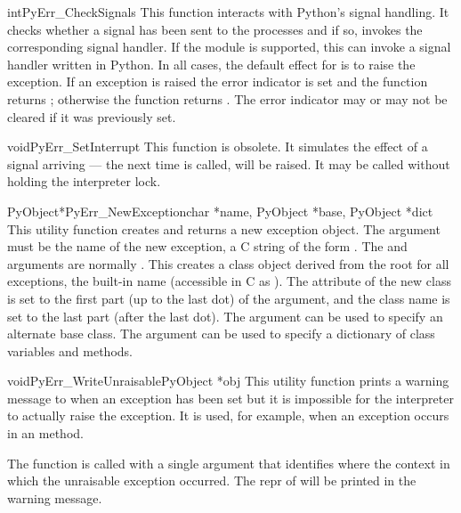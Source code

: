 \begin{cfuncdesc}{int}{PyErr_CheckSignals}{}
  This function interacts with Python's signal handling.  It checks
  whether a signal has been sent to the processes and if so, invokes
  the corresponding signal handler.  If the
   module is supported, this can
  invoke a signal handler written in Python.  In all cases, the
  default effect for  is to raise the
   exception.  If an exception is raised
  the error indicator is set and the function returns ;
  otherwise the function returns .  The error indicator may or
  may not be cleared if it was previously set.
\end{cfuncdesc}

\begin{cfuncdesc}{void}{PyErr_SetInterrupt}{}
  This function is obsolete.  It simulates the effect of a
   signal arriving --- the next time
   is called,
   will be raised.  It may be called
  without holding the interpreter lock.
\end{cfuncdesc}

\begin{cfuncdesc}{PyObject*}{PyErr_NewException}{char *name,
                                                 PyObject *base,
                                                 PyObject *dict}
  This utility function creates and returns a new exception object.
  The  argument must be the name of the new exception, a C
  string of the form .  The  and
   arguments are normally \NULL.  This creates a class
  object derived from the root for all exceptions, the built-in name
   (accessible in C as ).
  The  attribute of the new class is set to the
  first part (up to the last dot) of the  argument, and the
  class name is set to the last part (after the last dot).  The
   argument can be used to specify an alternate base class.
  The  argument can be used to specify a dictionary of class
  variables and methods.
\end{cfuncdesc}

\begin{cfuncdesc}{void}{PyErr_WriteUnraisable}{PyObject *obj}
  This utility function prints a warning message to 
  when an exception has been set but it is impossible for the
  interpreter to actually raise the exception.  It is used, for
  example, when an exception occurs in an  method.

  The function is called with a single argument  that
  identifies where the context in which the unraisable exception
  occurred.  The repr of  will be printed in the warning
  message.
\end{cfuncdesc}

